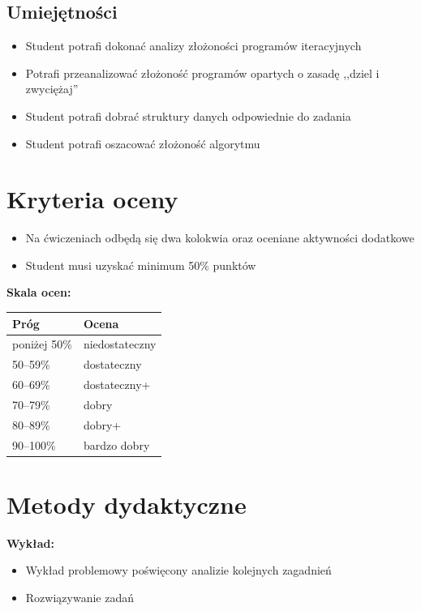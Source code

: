 \documentclass[12pt, a4paper]{article}
\begin{document}
\subsection*{Umiejętności}
\begin{itemize}
  \item Student potrafi dokonać analizy złożoności programów iteracyjnych
  \item Potrafi przeanalizować złożoność programów opartych o zasadę ,,dziel i zwyciężaj''
  \item Student potrafi dobrać struktury danych odpowiednie do zadania
  \item Student potrafi oszacować złożoność algorytmu
\end{itemize}

\section{Kryteria oceny}

\begin{itemize}
  \item Na ćwiczeniach odbędą się dwa kolokwia oraz oceniane aktywności dodatkowe
  \item Student musi uzyskać minimum 50\% punktów
\end{itemize}

\vspace{6pt}
\noindent\textbf{Skala ocen:}

\begin{tabular}{ll}
  \toprule
  \textbf{Próg} & \textbf{Ocena} \\
  \midrule
  poniżej 50\% & niedostateczny \\
  50--59\%     & dostateczny \\
  60--69\%     & dostateczny+ \\
  70--79\%     & dobry \\
  80--89\%     & dobry+ \\
  90--100\%    & bardzo dobry \\
  \bottomrule
\end{tabular}

\section{Metody dydaktyczne}

\textbf{Wykład:}
\begin{itemize}
  \item Wykład problemowy poświęcony analizie kolejnych zagadnień
  \item Rozwiązywanie zadań
\end{itemize}
\end{document}
